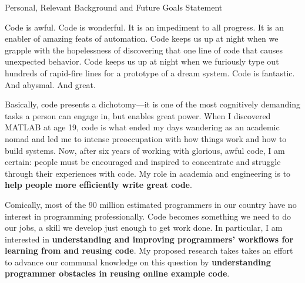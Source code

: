 \documentclass[12pt]{memoir}
\title{}
\author{Andrew Head}
\begin{document}
\begin{center}
Personal, Relevant Background and Future Goals Statement
\end{center}
\vspace{-1ex}



Code is awful.
Code is wonderful.
It is an impediment to all progress.
It is an enabler of amazing feats of automation.
Code keeps us up at night when we grapple with the hopelessness of discovering that one line of code that causes unexpected behavior.
Code keeps us up at night when we furiously type out hundreds of rapid-fire lines for a prototype of a dream system.
Code is fantastic.
And abysmal.
And great.

Basically, code presents a dichotomy---it is one of the most cognitively demanding tasks a person can engage in, but enables great power.
When I discovered MATLAB at age 19, code is what ended my days wandering as an academic nomad and led me to intense preoccupation with how things work and how to build systems.
Now, after six years of working with glorious, awful code, I am certain:
people must be encouraged and inspired to concentrate and struggle through their experiences with code.
My role in academia and engineering is to \textbf{help people more efficiently write great code}.

Comically, most of the 90 million estimated programmers in our country have no interest in programming professionally.
Code becomes something we need to do our jobs, a skill we develop just enough to get work done.
In particular, I am interested in \textbf{understanding and improving programmers' workflows for learning from and reusing code}.
My proposed research takes takes an effort to advance our communal knowledge on this question by \textbf{understanding programmer obstacles in reusing online example code}.
\end{document}
